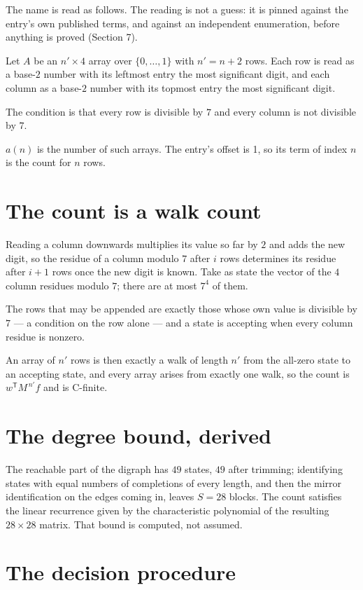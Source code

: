 \documentclass[11pt]{article}
\theoremstyle{definition}
\begin{document}
The name is read as follows. The reading is not a guess: it is pinned against the entry's own published terms, and against an independent enumeration, before anything is proved (Section 7).

Let $A$ be an $n' \times 4$ array over $\{0,\dots,1\}$ with $n' = n + 2$ rows. Each row is read as a base-$2$ number with its leftmost entry the most significant digit, and each column as a base-$2$ number with its topmost entry the most significant digit.

The condition is that every row is divisible by $7$ and every column is not divisible by $7$.

$a(n)$ is the number of such arrays. The entry's offset is 1, so its term of index $n$ is the count for $n$ rows.

\section{The count is a walk count}

Reading a column downwards multiplies its value so far by $2$ and adds the new digit, so the residue of a column modulo $7$ after $i$ rows determines its residue after $i+1$ rows once the new digit is known. Take as state the vector of the $4$ column residues modulo $7$; there are at most $7^{4}$ of them.

The rows that may be appended are exactly those whose own value is divisible by $7$ --- a condition on the row alone --- and a state is accepting when every column residue is nonzero.

An array of $n'$ rows is then exactly a walk of length $n'$ from the all-zero state to an accepting state, and every array arises from exactly one walk, so the count is $w^{\mathsf T}M^{\,n'}f$ and is C-finite.

\section{The degree bound, derived}

The reachable part of the digraph has $49$ states, $49$ after trimming; identifying states with equal numbers of completions of every length, and then the mirror identification on the edges coming in, leaves $S = 28$ blocks. The count satisfies the linear recurrence given by the characteristic polynomial of the resulting $28\times28$ matrix. That bound is computed, not assumed.

\section{The decision procedure}
\end{document}
